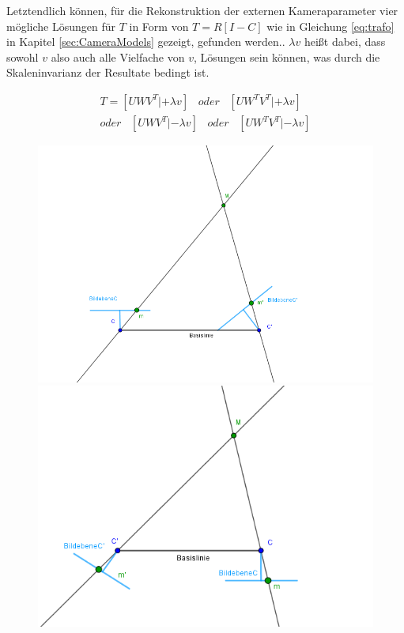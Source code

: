 Letztendlich können, für die Rekonstruktion der externen Kameraparameter vier mögliche Lösungen für $T$ in Form von $T = R[I-C]$ wie in Gleichung \ref{eq:trafo} in Kapitel \ref{sec:CameraModels} gezeigt, gefunden werden.\cite{HZ,Ferid}. $\lambda v$ heißt dabei, dass sowohl $v$ also auch alle Vielfache von $v$, Lösungen sein können, was durch die Skaleninvarianz der Resultate bedingt ist\cite{HZ,Ferid}. 

\begin{gather}
T = [UWV^T|+\lambda v] \;\;\; \textit{oder} \;\;\;[UW^TV^T|+\lambda v]\\
\textit{oder}\;\;\; [UWV^T|-\lambda v] \;\;\; \textit{oder} \;\;\;[UW^TV^T|-\lambda v]
\end{gather}

\begin{figure}[!htb]
	\includegraphics[width=\linewidth]{images/P_Solution_one.png}
	\label{fig:T_1}
	\endminipage\hfill
	\includegraphics[width=\linewidth]{images/P_Solution_two.png}
	\label{fig:T_2}
	\endminipage\hfill
\end{figure}
